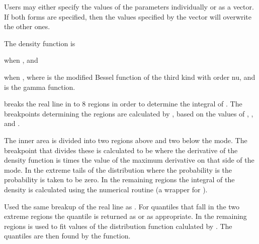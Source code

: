 \begin{Details}\relax
Users may either specify the values of the parameters individually or
as a vector. If both forms are specified, then the values specified by
the vector  will overwrite the other ones.

The density function is


when , and


when ,
where  is the modified Bessel function of the third
kind with order nu, and  is the gamma function.

 breaks the real line in to 8 regions in order to
determine the integral of . The breakpoints determining
the regions are calculated by , based on the
values of , , and .

The inner area is divided into two regions above and two below the
mode. The breakpoint that divides these is calculated to be where the
derivative of the density function is  times the value of
the maximum derivative on that side of the mode. In the extreme tails
of the distribution where the probability is  the
probability is taken to be zero. In the remaining regions the integral
of the density is calculated using the numerical routine
 (a wrapper for
).

 Used the same breakup of the real line as
. For quantiles that fall in the two extreme regions
the quantile is returned as  or  as
appropriate. In the remaining regions  is used to fit
values of the distribution function calulated by . The
quantiles are then found by the  function.
\end{Details}
